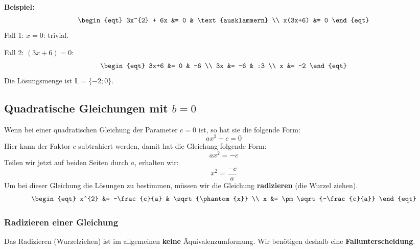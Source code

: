 \begin{example}
  \textbf{Beispiel:}
  \[\begin{eqt}
    3x^{2} + 6x &= 0 & \text{ausklammern} \\
        x(3x+6) &= 0
  \end{eqt}\]
  Fall 1: $x = 0$: trivial.

  Fall 2: $(3x+6) = 0$:
  \[\begin{eqt}
    3x+6 &= 0  & -6 \\
      3x &= -6 & :3 \\
       x &= -2
  \end{eqt}\]
  Die Lösungsmenge ist $\mathbb{L} = \{-2;0\}$.
\end{example}


\subsection{Quadratische Gleichungen mit $b=0$}
Wenn bei einer quadratischen Gleichung der Parameter $c = 0$ ist, so hat sie die folgende Form:
\[
ax^{2} + c = 0
\]
Hier kann der Faktor $c$ subtrahiert werden, damit hat die Gleichung folgende Form:
\[
ax^2 = -c
\]
Teilen wir jetzt auf beiden Seiten durch $a$, erhalten wir:
\[
x^2 = \frac{-c}{a}
\]
Um bei dieser Gleichung die Lösungen zu bestimmen, müssen wir die Gleichung \textbf{radizieren} (die Wurzel ziehen).
\[\begin{eqt}
       x^{2} &= -\frac{c}{a} & \sqrt{\phantom{x}} \\
x &= \pm\sqrt{-\frac{c}{a}}
\end{eqt}\]

\subsubsection{Radizieren einer Gleichung}
Das Radizieren (Wurzelziehen) ist im allgemeinen \textbf{keine} Äquivalenzumformung. Wir benötigen deshalb eine \textbf{Fallunterscheidung}. 

